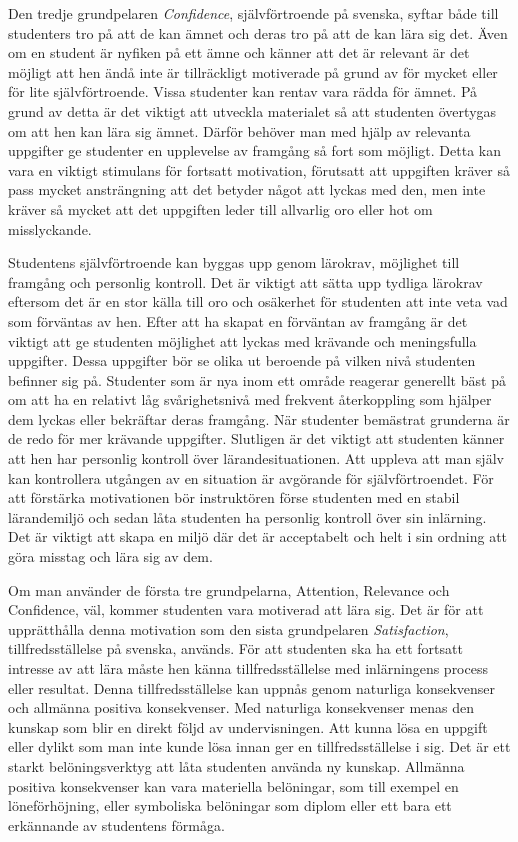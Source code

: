 \documentclass[12pt,a4paper,twoside,openright]{article}
\begin{document}
Den tredje grundpelaren \textit{Confidence}, självförtroende på
svenska, syftar både till studenters tro på att de kan ämnet och deras
tro på att de kan lära sig det. Även om en student är nyfiken på ett
ämne och känner att det är relevant är det möjligt att hen ändå inte
är tillräckligt motiverade på grund av för mycket eller för lite
självförtroende. Vissa studenter kan rentav vara rädda för ämnet. På
grund av detta är det viktigt att utveckla materialet så att studenten
övertygas om att hen kan lära sig ämnet. Därför behöver man med hjälp
av relevanta uppgifter ge studenter en upplevelse av framgång så fort
som möjligt. Detta kan vara en viktigt stimulans för fortsatt
motivation, förutsatt att uppgiften kräver så pass mycket ansträngning
att det betyder något att lyckas med den, men inte kräver så mycket
att det uppgiften leder till allvarlig oro eller hot om misslyckande.

Studentens självförtroende kan byggas upp genom lärokrav, möjlighet
till fram\-gång och personlig kontroll. Det är viktigt att sätta upp
tydliga lärokrav eftersom det är en stor källa till oro och osäkerhet
för studenten att inte veta vad som förväntas av hen. Efter att ha
skapat en förväntan av framgång är det viktigt att ge studenten
möjlighet att lyckas med krävande och meningsfulla uppgifter. Dessa
uppgifter bör se olika ut beroende på vilken nivå studenten befinner
sig på. Studenter som är nya inom ett område reagerar generellt bäst
på om att ha en relativt låg svårighetsnivå med frekvent återkoppling
som hjälper dem lyckas eller bekräftar deras framgång. När studenter
bemästrat grunderna är de redo för mer krävande uppgifter. Slutligen
är det viktigt att studenten känner att hen har personlig kontroll
över lärandesituationen. Att uppleva att man själv kan kontrollera
utgången av en situation är avgörande för självförtroendet. För att
förstärka motivationen bör instruktören förse studenten med en stabil
lärandemiljö och sedan låta studenten ha personlig kontroll över sin
inlärning. Det är viktigt att skapa en miljö där det är acceptabelt
och helt i sin ordning att göra misstag och lära sig av dem.

Om man använder de första tre grundpelarna, Attention, Relevance och
Confidence, väl, kommer studenten vara motiverad att lära sig. Det är
för att upprätthålla denna motivation som den sista grundpelaren
\textit{Satisfaction}, tillfredsställelse på svenska, används. För att
studenten ska ha ett fortsatt intresse av att lära måste hen känna
tillfredsställelse med inlärningens process eller resultat. Denna
tillfredsställelse kan uppnås genom naturliga konsekvenser och
allmänna positiva konsekvenser. Med naturliga konsekvenser menas den
kunskap som blir en direkt följd av undervisningen. Att kunna lösa en
uppgift eller dylikt som man inte kunde lösa innan ger en
tillfredsställelse i sig. Det är ett starkt belöningsverktyg att låta
studenten använda ny kunskap. Allmänna positiva konsekvenser kan vara
materiella belöningar, som till exempel en löneförhöjning, eller
symboliska belöningar som diplom eller ett bara ett erkännande av
studentens förmåga.
\end{document}
